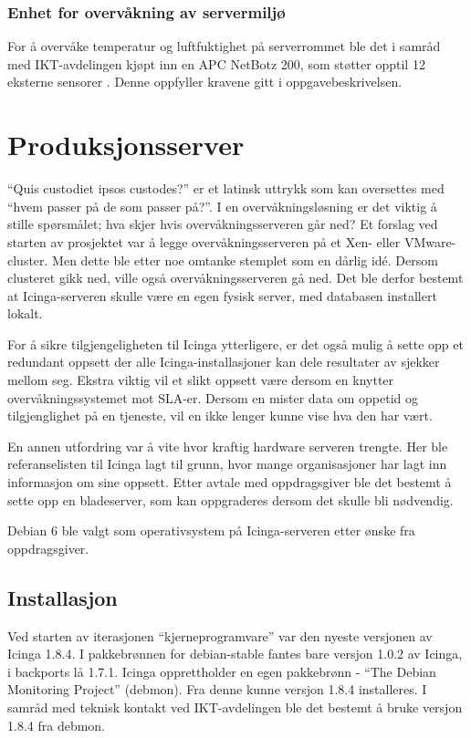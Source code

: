 \subsubsection{Enhet for overvåkning av servermiljø}
For å overvåke temperatur og luftfuktighet på serverrommet ble det i samråd med IKT-avdelingen kjøpt inn en APC NetBotz 200, som støtter opptil 12 eksterne sensorer \cite{netbotz}. Denne oppfyller kravene gitt i oppgavebeskrivelsen. 

\section{Produksjonsserver}
``Quis custodiet ipsos custodes?'' er et latinsk uttrykk som kan oversettes med ``hvem passer på de som passer på?''. I en overvåkningsløsning er det viktig å stille spørsmålet; hva skjer hvis overvåkningsserveren går ned? Et forslag ved starten av prosjektet var å legge overvåkningsserveren på et Xen- eller VMware-cluster. Men dette ble etter noe omtanke stemplet som en dårlig idé. Dersom clusteret gikk ned, ville også overvåkningsserveren gå ned. Det ble derfor bestemt at Icinga-serveren skulle være en egen fysisk server, med databasen installert lokalt.

For å sikre tilgjengeligheten til Icinga ytterligere, er det også mulig å sette opp et redundant oppsett der alle Icinga-installasjoner kan dele resultater av sjekker mellom seg. Ekstra viktig vil et slikt oppsett være dersom en knytter overvåkningssystemet mot SLA-er. Dersom en mister data om oppetid og tilgjenglighet på en tjeneste, vil en ikke lenger kunne vise hva den har vært.

En annen utfordring var å vite hvor kraftig hardware serveren trengte. Her ble referanselisten til Icinga lagt til grunn, hvor mange organisasjoner har lagt inn informasjon om sine oppsett\cite{icingainaction}. Etter avtale med oppdragsgiver ble det bestemt å sette opp en bladeserver, som kan oppgraderes dersom det skulle bli nødvendig. 

Debian 6 ble valgt som operativsystem på Icinga-serveren etter ønske fra oppdragsgiver. 
\subsection{Installasjon}
Ved starten av iterasjonen ``kjerneprogramvare'' var den nyeste versjonen av Icinga 1.8.4. I pakkebrønnen for debian-stable fantes bare versjon 1.0.2 av Icinga, i backports lå 1.7.1. Icinga opprettholder en egen pakkebrønn - ``The Debian Monitoring Project''\cite{debmon} (debmon). Fra denne kunne versjon 1.8.4 installeres. I samråd med teknisk kontakt ved IKT-avdelingen ble det bestemt å bruke versjon 1.8.4 fra debmon.

